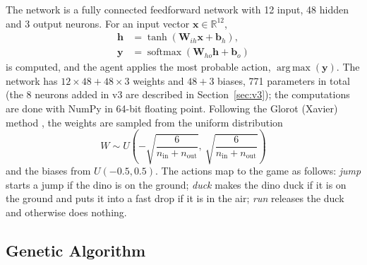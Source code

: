 \documentclass[11pt,a4paper]{article}
\begin{document}
The network is a fully connected feedforward network with 12 input, 48 hidden and 3 output neurons. For an input vector $\mathbf{x}\in\mathbb{R}^{12}$,
\begin{align}
  \mathbf{h} &= \tanh(\mathbf{W}_{ih}\mathbf{x}+\mathbf{b}_{h}),\\
  \mathbf{y} &= \operatorname{softmax}(\mathbf{W}_{ho}\mathbf{h}+\mathbf{b}_{o})
\end{align}
is computed, and the agent applies the most probable action, $\operatorname*{arg\,max}(\mathbf{y})$. The network has $12\times48 + 48\times3$ weights and $48 + 3$ biases, 771 parameters in total (the 8 neurons added in v3 are described in Section~\ref{sec:v3}); the computations are done with NumPy \cite{numpy} in 64-bit floating point. Following the Glorot (Xavier) method \cite{glorot2010}, the weights are sampled from the uniform distribution
\begin{equation}
  W \sim U\!\left(-\sqrt{\frac{6}{n_{\text{in}}+n_{\text{out}}}},\ \sqrt{\frac{6}{n_{\text{in}}+n_{\text{out}}}}\right)
\end{equation}
and the biases from $U(-0.5, 0.5)$. The actions map to the game as follows: \emph{jump} starts a jump if the dino is on the ground; \emph{duck} makes the dino duck if it is on the ground and puts it into a fast drop if it is in the air; \emph{run} releases the duck and otherwise does nothing.

\subsection{Genetic Algorithm}
\end{document}
